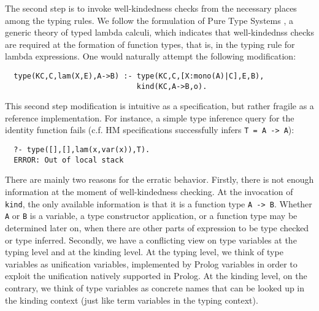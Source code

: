 \documentclass[runningheads,a4paper]{llncs}
\begin{document}
The second step is to invoke well-kindedness checks from the necessary
places among the typing rules. We follow the formulation of Pure Type
Systems \cite{Barendregt91}, a generic theory of typed lambda calculi,
which indicates that well-kindednss checks are required at the
formation of function types, that is, in the typing rule for lambda
expressions. One would naturally attempt the following modification:%
{\small\vspace*{-1ex}
\begin{verbatim}
  type(KC,C,lam(X,E),A->B) :- type(KC,C,[X:mono(A)|C],E,B),
                              kind(KC,A->B,o).
\end{verbatim} \vspace*{-.7ex} }\noindent
This second step modification is intuitive as a specification, but
rather fragile as a reference implementation. For instance,
a simple type inference query for the identity function fails
(c.f. HM specifications successfully infers \verb|T = A -> A|):{\small \vspace*{-1ex}
\begin{verbatim}
  ?- type([],[],lam(x,var(x)),T).
  ERROR: Out of local stack
\end{verbatim} \vspace*{-.7ex} }

There are mainly two reasons for the erratic behavior.
Firstly, there is not enough information at the moment of
well-kindedness checking. At the invocation of \verb|kind|,
the only available information is that it is a function type \verb|A -> B|.
Whether \verb|A| or \verb|B| is a variable, a type constructor application,
or a function type may be determined later on, when there are other parts
of expression to be type checked or type inferred. Secondly, we have
a conflicting view on type variables at the typing level and
at the kinding level. At the typing level, we think of type variables as
unification variables, implemented by Prolog variables in order to exploit
the unification natively supported in Prolog. At the kinding level,
on the contrary, we think of type variables as concrete names that
can be looked up in the kinding context (just like term variables
in the typing context).
\end{document}
